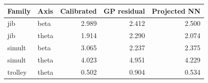 \begin{tabular}{llrrr}
\toprule
Family & Axis & Calibrated & GP residual & Projected NN \\
\midrule
jib & beta & 2.989 & 2.412 & 2.500 \\
jib & theta & 1.914 & 2.290 & 2.074 \\
simult & beta & 3.065 & 2.237 & 2.375 \\
simult & theta & 4.023 & 4.951 & 4.229 \\
trolley & theta & 0.502 & 0.904 & 0.534 \\
\bottomrule
\end{tabular}
